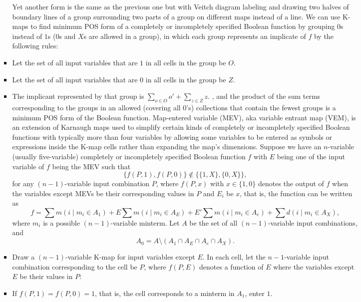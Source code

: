\documentclass[a4paper,12pt]{article}
\begin{document}
\begin{itemize}
\begin{itemize}
\begin{itemize}
\begin{itemize}
\begin{itemize}
\begin{itemize}
\begin{itemize}
Yet another form is the same as the previous one but with Veitch diagram labeling and drawing two halves of boundary lines of a group surrounding two parts of a group on different maps instead of a line.
We can use K-maps to find minimum POS form of a completely or incompletely specified Boolean function by grouping $0$s instead of $1$s ($0$s and $X$s are allowed in a group), in which each group represents an implicate of $f$ by the following rules:
\ben
\item Let the set of all input variables that are $1$ in all cells in the group be $O$.
\item Let the set of all input variables that are $0$ in all cells in the group be $Z$.
\item The implicant represented by that group is $\sum_{o\in O}o'+\sum_{z\in Z}z$.
\een
, and the product of the sum terms corresponding to the groups in an allowed (covering all 0's) collections that contain the fewest groups is a minimum POS form of the Boolean function.
Map-entered variable (MEV), aka variable entrant map (VEM), is an extension of Karnaugh maps used to simplify certain kinds of completely or incompletely specified Boolean functions with typically more than four variables by allowing some variables to be entered as symbols or expressions inside the K-map cells rather than expanding the map's dimensions.
Suppose we have an $n$-variable (usually five-variable) completely or incompletely specified Boolean function $f$ with $E$ being one of the input variable of $f$ being the MEV such that
\[\{f(P,1),f(P,0)\}\notin\{\{1,X\},\{0,X\}\},\]
for any $(n-1)$-variable input combination $P$, where $f(P,x)$ with $x\in\{1,0\}$ denotes the output of $f$ when the variables except MEVs be their corresponding values in $P$ and $E_i$ be $x$, that is, the function can be written as
\[f=\sum m(i\mid m_i\in A_1)+E\sum m(i\mid m_i\in A_E)+E'\sum m(i\mid m_i\in A_e)+\sum d(i\mid m_i\in A_X),\]
where $m_i$ is a possible $(n-1)$-variable minterm. Let $A$ be the set of all $(n-1)$-variable input combinations, and
\[A_0=A\setminus(A_1\cap A_E\cap A_e\cap A_X).\]
\ben
\item Draw a $(n-1)$-variable K-map for input variables except $E$. In each cell, let the $n-1$-variable input combination corresponding to the cell be $P$, where $f(P,E)$ denotes a function of $E$ where the variables except $E$ be their values in $P$:
\bit
\item If $f(P,1)=f(P,0)=1$, that is, the cell corresponds to a minterm in $A_1$, enter $1$.

\end{itemize}
\end{itemize}
\end{itemize}
\end{itemize}
\end{itemize}
\end{itemize}
\end{itemize}
\end{document}
